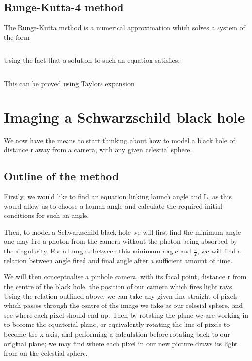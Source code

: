 \documentclass[oneside,openright,frontopenright, singlespacing]{dmathesis}
\begin{document}
\section{Runge-Kutta-4 method}

	The Runge-Kutta method is a numerical approximation which solves a system of the form

\vspace{1em}
\[\]

\vspace{1em}
	Using the fact that a solution to such an equation satisfies:

\vspace{1em}
\[\]

\vspace{1em}
	This can be proved using Taylors expansion

\chapter{Imaging a Schwarzschild black hole}

	We now have the means to start thinking about how to model a black hole of distance r away from a camera, with any given celestial sphere.

\section{Outline of the method}

	Firstly, we would like to find an equation linking launch angle and L, as this would allow us to choose a launch angle and calculate the required initial conditions for such an angle.

\vspace{1em}
	Then, to model a Schwarzschild black hole we will first find the minimum angle one may fire a photon from the camera without the photon being absorbed by the singularity. For all angles between this minimum angle and $\frac{\pi}{2}$, we will find a relation between angle fired and final angle after a sufficient amount of time.

\vspace{1em}
	We will then conceptualise a pinhole camera, with its focal point, distance r from the centre of the black hole, the position of our camera which fires light rays. Using the relation outlined above, we can take any given line straight of pixels which passes through the centre of the image we take as our celesial sphere, and see where each pixel should end up. Then by rotating the plane we are working in to become the equatorial plane, or equivalently rotating the line of pixels to become the x axis, and performing a calculation before rotating back to our original plane; we may find where each pixel in our new picture draws its light from on the celestial sphere.
\end{document}

